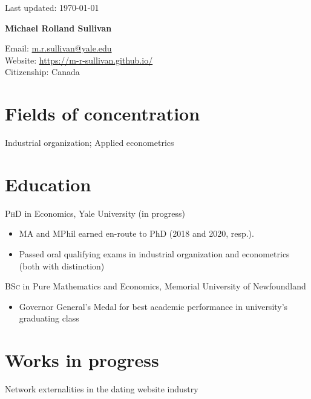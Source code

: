 \documentclass[11pt]{article} %
\begin{document}
 \begin{flushright}
   \scriptsize
	Last updated: \today
   \normalsize
\end{flushright}
{\LARGE\bfseries Michael Rolland Sullivan} %
\bigskip\bigskip\medskip %

\medskip %

Email: \href{mailto:m.r.sullivan@yale.edu}{m.r.sullivan@yale.edu}\\ 
Website: \href{https://m-r-sullivan.github.io/}{https://m-r-sullivan.github.io/}\\ 

Citizenship: Canada 

\section*{Fields of concentration}

Industrial organization; Applied econometrics 

\section*{Education}

\textsc{PhD} in Economics, Yale University (in progress)
\begin{itemize}
	\item MA and MPhil earned en-route to PhD (2018 and 2020, resp.).
	\item Passed oral qualifying exams in industrial organization and econometrics (both with distinction)
\end{itemize}

\textsc{BSc} in Pure Mathematics and Economics, Memorial University of Newfoundland
\begin{itemize}
	\item Governor General's Medal for best academic performance in university's graduating class
\end{itemize}

\section*{Works in progress}

Network externalities in the dating website industry
\end{document}
